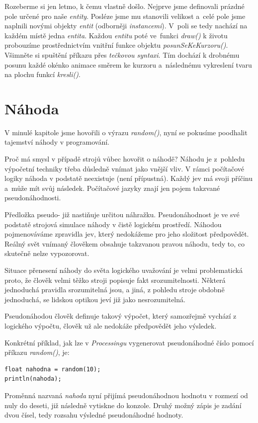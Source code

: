 \documentclass[10pt,twoside=true,open=right,cleardoublepage=empty,chapterprefix=true]{scrbook}
\newcommand{\oddil}[1]{\section{#1}\index{#1}\label{#1}}
\newcommand{\vyraz}[1]{\textit{\gls{#1}}\index{#1}\label{#1}}
\newcommand{\lnb}{\linebreak}
\begin{document}
Rozeberme si jen letmo, k čemu vlastně došlo. Nejprve jsme definovali prázdné pole určené pro naše {\em entity}. Posléze jsme mu stanovili velikost a~celé pole jsme naplnili novými objekty {\em entit} (odborněji {\em instancemi}). V~poli se tedy nachází na každém místě jedna {\em entita}. Každou {\em entitu} poté ve~funkci \vyraz{draw()} k životu probouzíme prostřednictvím vnitřní funkce objektu {\em posunSeKeKurzoru()}. Všimněte si spuštění příkazu přes {\em tečkovou syntaxi}. Tím dochází k drobnému posunu každé okénko animace směrem ke kurzoru a~následnému vykreslení tvaru na plochu funkcí {\em kresli()}.



\oddil{Náhoda}

V minulé kapitole jsme hovořili o výrazu \vyraz{random()}, nyní se pokusíme poodhalit tajemství náhody v programování.

Proč má smysl v případě strojů vůbec hovořit o náhodě? Náhodu je z~pohledu výpočetní techniky třeba důsledně vnímat jako vnější vliv. V rámci počítačové logiky náhoda v podstatě neexistuje (není přípustná). Každý jev má svoji příčinu a~může mít svůj následek. Počítačové jazyky znají jen pojem takzvané pseudonáhodnosti.

Předložka pseudo- již nastiňuje určitou náhražku. Pseudonáhodnost je ve své podstatě strojová simulace náhody v čistě logickém prostředí. Náhodou pojmenováváme zpravidla jev, který nedokážeme pro jeho složitost předpovědět. Reálný svět vnímaný člověkem obsahuje takzvanou pravou náhodu, tedy to, co skutečně nelze vypozorovat.

Situace přenesení náhody do světa logického uvažování je velmi problematická proto, že člověk velmi těžko stroji popisuje fakt srozumitelnosti. Některá jednoduchá pravidla srozumitelná jsou, a jiná, z pohledu stroje \lnb obdobně jednoduchá, se lidskou optikou jeví již jako nesrozumitelná.

Pseudonáhodou člověk definuje takový výpočet, který samozřejmě vychází z logického výpočtu, člověk už ale nedokáže předpovědět jeho \lnb výsledek.

Konkrétní příklad, jak lze v {\em Processingu} vygenerovat pseudonáhodné číslo pomocí příkazu \vyraz{random()}, je:

\begin{lstlisting}
float nahodna = random(10);
println(nahoda);
\end{lstlisting}

Proměnná nazvaná {\em nahoda} nyní přijímá pseudonáhodnou hodnotu v rozmezí od nuly do deseti, již následně vytiskne do konzole. Druhý možný zápis je zadání dvou čísel, tedy rozsahu výsledné pseudonáhodné hodnoty.
\end{document}
